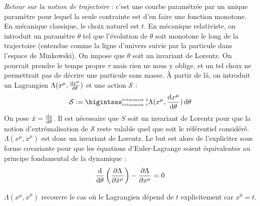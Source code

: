 {\txt \emph{Retour sur la notion de trajectoire }: c'est une courbe paramétrée par un unique paramètre pour lequel la seule contrainte est d'en faire une fonction monotone. En mécanique classique, le choix naturel est $t$. En mécanique relativiste, on introduit un paramètre $\theta$ tel que l'évolution de $\theta$ soit monotone le long de la trajectoire (entendue comme la ligne d'univers suivie par la particule dans l'espace de Minkowski). On impose que $\theta$ soit un invariant de Lorentz. On pourrait prendre le temps propre $\tau$ mais rien ne nous y oblige, et un tel choix ne permettrait pas de décrire une particule sans masse. À partir de là, on introduit un Lagrangien $\Lambda(x^\mu,\frac{\mathrm{d} x^\mu}{\mathrm{d}\theta})$ et une action $\mathcal{S}$ :}
$$
	\mathcal{S}\defeq\bigintsss_{\text{\tiny évènement 1}}^{\text{\tiny évènement 2}} \Lambda(x^\mu,\frac{\dif x^\mu}{\dif\theta})\,\dif\theta
$$
{\txt On pose $\dot{x}=\frac{\mathrm{d} x}{\mathrm{d}\theta}$. Il est nécessaire que $S$ soit un invariant de Lorentz pour que la notion d'extrémalisation de $\mathcal{S}$ reste valable quel que soit le référentiel considéré. $\Lambda(x^\mu,\dot{x}^\mu)$ est donc un invariant de Lorentz. Le but est alors de l'expliciter sous forme covariante pour que les équations d'Euler-Lagrange soient équivalentes au principe fondamental de la dynamique :}
$$
	\frac{\mathrm{d}}{\mathrm{d}\theta}\left(\frac{\partial \Lambda}{\partial\dot{x}^\mu}\right)-\frac{\partial\Lambda}{\partial x^\mu}=0
$$ 
\begin{remark}
	$\Lambda(x^\mu,\dot{x}^\mu)$ recouvre le cas où le Lagrangien dépend de $t$ explicitement car $x^0=t$.
\end{remark}

